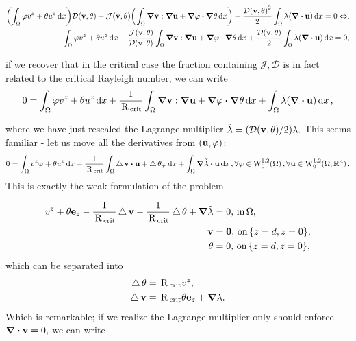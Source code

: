 \documentclass[../main.tex]{subfiles}
\begin{document}
\begin{align*}
	\qty(\int_{\Omega}\varphi v^z + \theta u^z\dd{x}) \mathcal{D}\qty(\vb{v}, \theta) + \mathcal{J}\qty(\vb{v}, \theta)\qty(\int_{\Omega}\grad \vb{v} : \grad \vb{u} + \grad \varphi \vdot \grad \theta\dd{x}) + \frac{\mathcal{D}\qty(\vb{v}, \theta)^{2}}{2}\int_{\Omega}\lambda\qty(\divergence{\vb{u}})\dd{x} = 0 \Leftrightarrow, \\
	\int_{\Omega}\varphi v^z + \theta u^z\dd{x} + \frac{\mathcal{J}\qty(\vb{v}, \theta)}{\mathcal{D}\qty(\vb{v}, \theta)} \int_{\Omega}\grad \vb{v} : \grad \vb{u} + \grad \varphi \vdot \grad \theta\dd{x} + \frac{\mathcal{D}\qty(\vb{v}, \theta)}{2} \int_{\Omega}\lambda\qty(\divergence{\vb{u}})\dd{x} = 0, 
\end{align*}

if we recover that in the critical case the fraction containing $\mathcal{J}, \mathcal{D}$ is in fact related to the critical Rayleigh number, we can write
\[
	0 = \int_{\Omega} \varphi v^z + \theta u^z \dd{x} + \frac{1}{\, \text{R} \,_{\text{crit}}}\int_{\Omega}\grad \vb{v} : \grad \vb{u} + \grad \varphi \vdot \grad \theta\dd{x} + \int_{\Omega}\tilde{\lambda}\qty(\divergence{\vb{u}})\dd{x},
\]

where we have just rescaled the Lagrange multiplier $\tilde{\lambda} = \qty(\mathcal{D}\qty(\vb{v}, \theta)/2) \lambda.$ This seems familiar - let us move all the derivatives from $\qty(\vb{u}, \varphi)$:
\[
	0 = \int_{\Omega}v^z \varphi + \theta u^z \dd{x} - \frac{1}{\, \text{R} \,_{\text{crit}}}\int_{\Omega}\laplace \vb{v} \vdot \vb{u} + \laplace \theta \varphi \dd{x} + \int_{\Omega} \grad \tilde{\lambda} \vdot \vb{u}\dd{x}, \forall \varphi \in \WkpzeroSet[1][2]{\Omega}, \forall \vb{u} \in \WkpzeroSet[1][2]{\Omega;\R^{n}}.
\]
This is exactly the weak formulation of the problem

\begin{align*}
	v^z + \theta \vb{e}_z - \frac{1}{\, \text{R} \,_{\text{crit}}} \operatorname{\bigtriangleup} \vb{v} - \frac{1}{\, \text{R} \,_{\text{crit}}}\operatorname{\bigtriangleup} \theta + \grad \tilde{\lambda} &= 0, \, \text{in} \, \Omega, \\
	\vb{v} &= \vb{0}, \, \text{on} \, \qty{z=d, z=0},\\
	\theta &= 0, \, \text{on} \, \qty{z = d, z=0},
\end{align*}
which can be separated into
\begin{align}
	\operatorname{\bigtriangleup} \theta &= \, \text{R} \,_{\text{crit}} v^z,\\
	\operatorname{\bigtriangleup} \vb{v} &= \, \text{R} \,_{\text{crit}}\theta \vb{e}_z + \grad \lambda.
\end{align}
Which is remarkable; if we realize the Lagrange multiplier only should enforce $\divergence{\vb{v}} = 0,$ we can write
\end{document}
